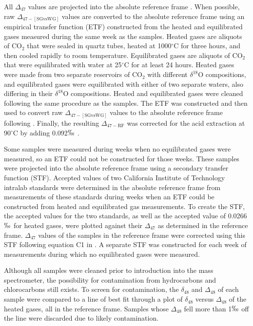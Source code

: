 \documentclass{article}
\newcommand{\deltao}{$\delta^{18}$}
\newcommand{\degrees}{$^{\circ}$}
\begin{document}
All $\Delta_{47}$ values are projected into the absolute reference frame \citep{Dennis2011}. When possible, raw $\Delta_{47-[\text{SGvsWG}]}$ values are converted to the absolute reference frame using an empirical transfer function (ETF) constructed from the heated and equilibrated  gases measured during the same week as the samples. Heated gases are aliquots of CO$_2$ that were sealed in quartz tubes, heated at 1000\degrees C for three hours, and then cooled rapidly to room temperature. Equilibrated gases are aliquots of CO$_2$ that were equilibrated with water at 25\degrees C for at least 24 hours. Heated gases were made from two separate reservoirs of CO$_2$ with different \deltao O compositions, and equilibrated gases were equilibrated with either of two separate waters, also differing in their \deltao O compositions. Heated and equilibrated gases were cleaned following the same procedure as the samples. The ETF was constructed and then used to convert raw $\Delta_{47-[\text{SGvsWG}]}$ values to the absolute reference frame following \cite{Dennis2011}. Finally, the resulting $\Delta_{47-\text{RF}}$ was corrected for the acid extraction at 90\degrees C by adding 0.092$\permil$ \citep{Henkes2013}. 

Some samples were measured during weeks when no equilibrated gases were measured, so an ETF could not be constructed for those weeks. These samples were projected into the absolute reference frame using a secondary transfer function (STF). Accepted values of two California Institute of Technology intralab standards were determined in the absolute reference frame from measurements of these standards during weeks when an ETF could be constructed from heated and equilibrated gas measurements. To create the STF, the accepted values for the two standards, as well as the accepted value of 0.0266$\permil$ for heated gases, were plotted against their $\Delta_{47}$ as determined in the \cite{Ghosh2006} reference frame. $\Delta_{47}$ values of the samples in the \cite{Ghosh2006} reference frame were corrected using this STF following equation C1 in \cite{Dennis2011}. A separate STF was constructed for each week of measurements during which no equilibrated gases were measured.

Although all samples were cleaned prior to introduction into the mass spectrometer, the possibility for contamination from hydrocarbons and chlorocarbons still exists. To screen for contamination, the $\delta_{48}$ and $\Delta_{48}$ of each sample were compared to a line of best fit through a plot of $\delta_{48}$ versus $\Delta_{48}$ of the heated gases, all in the \cite{Ghosh2006} reference frame. Samples whose $\Delta_{48}$ fell more than 1$\permil$ off the line were discarded due to likely contamination. 
\end{document}
